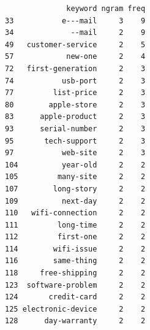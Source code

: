 \begin{Shaded}
\begin{Highlighting}[]

\OtherTok{\textless{}{-}} \SpecialCharTok{$}
                             \SpecialCharTok{$} \NormalTok{(}\NormalTok{, }\NormalTok{))}
\SpecialCharTok{$}\SpecialCharTok{\textgreater{}}  \SpecialCharTok{\&}\SpecialCharTok{\textgreater{}=} \NormalTok{)}
\end{Highlighting}
\end{Shaded}

\begin{verbatim}
              keyword ngram freq
33           e---mail     3    9
34             --mail     2    9
49   customer-service     2    5
57            new-one     2    4
72   first-generation     2    3
74           usb-port     2    3
77         list-price     2    3
80        apple-store     2    3
83      apple-product     2    3
93      serial-number     2    3
95       tech-support     2    3
97           web-site     2    3
104          year-old     2    2
105         many-site     2    2
107        long-story     2    2
109          next-day     2    2
110   wifi-connection     2    2
111         long-time     2    2
112         first-one     2    2
114        wifi-issue     2    2
116        same-thing     2    2
118     free-shipping     2    2
123  software-problem     2    2
124       credit-card     2    2
125 electronic-device     2    2
128      day-warranty     2    2
\end{verbatim}

\begin{Shaded}
\begin{Highlighting}[]
\OtherTok{\textless{}{-}} \SpecialCharTok{$}
                             \SpecialCharTok{$} \NormalTok{(}\NormalTok{, }\NormalTok{))}
\SpecialCharTok{$}\SpecialCharTok{\textgreater{}}  \SpecialCharTok{\&}\SpecialCharTok{\textgreater{}=} \NormalTok{)}
\end{Highlighting}
\end{Shaded}

